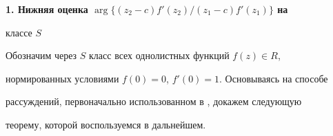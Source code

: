 \begin{center} 


{\large\bf 1. Нижняя оценка $\arg\{(z_2-c)f'(z_2)/(z_1-c)f'(z_1)\}$ на


классе $S$} 


\end{center}


\medskip


 


Обозначим через $S$ класс всех однолистных функций $f(z)\in R$, 


нормированных условиями $f(0)=0$, $f'(0)=1$. Основываясь на способе 


рассуждений, первоначально использованном в \cite{6}, докажем следующую 


теорему, которой воспользуемся в дальнейшем. 


 


